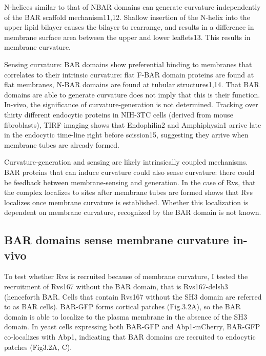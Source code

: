 N-helices similar to that of NBAR domains can generate curvature independently of the BAR scaffold mechanism11,12. Shallow insertion of the N-helix into the upper lipid bilayer causes the bilayer to rearrange, and results in a difference in membrane surface area between the upper and lower leaflets13. This results in membrane curvature. 
	\vspace{7mm}
	
Sensing curvature:
BAR domains show preferential binding to membranes that correlates to their intrinsic curvature: flat F-BAR domain proteins are found at flat membranes, N-BAR domains are found at tubular structures1,14. That BAR domains are able to generate curvature does not imply that this is their function. In-vivo, the significance of curvature-generation is not determined. Tracking over thirty different endocytic proteins in NIH-3TC cells (derived from mouse fibroblasts), TIRF imaging shows that Endophilin2 and Amphiphysin1 arrive late in the endocytic time-line right before scission15, suggesting they arrive when membrane tubes are already formed. 

	\vspace{7mm}
Curvature-generation and sensing are likely intrinsically coupled mechanisms. BAR proteins that can induce curvature could also sense curvature: there could be feedback between membrane-sensing and generation. In the case of Rvs, that the complex localizes to sites after membrane tubes are formed shows that Rvs localizes once membrane curvature is established. Whether this localization is dependent on membrane curvature, recognized by the BAR domain is not known. 



	\subsection{BAR domains sense membrane curvature in-vivo}


To test whether Rvs is recruited because of membrane curvature, I tested the recruitment of Rvs167 without the BAR domain, that is Rvs167-delsh3 (henceforth BAR. Cells that contain Rvs167 without the SH3 domain are referred to as BAR cells). BAR-GFP forms cortical patches (Fig.3.2A), so the BAR domain is able to localize to the plasma membrane in the absence of the SH3 domain. In yeast cells expressing both BAR-GFP and Abp1-mCherry, BAR-GFP co-localizes with Abp1, indicating that BAR domains are recruited to endocytic patches (Fig3.2A, C). 

